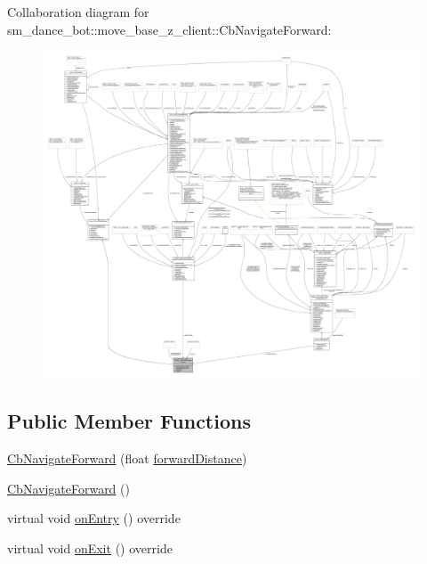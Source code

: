 Collaboration diagram for sm\+\_\+dance\+\_\+bot\+:\+:move\+\_\+base\+\_\+z\+\_\+client\+:\+:Cb\+Navigate\+Forward\+:
\nopagebreak
\begin{figure}[H]
\begin{center}
\leavevmode
\includegraphics[width=350pt]{classsm__dance__bot_1_1move__base__z__client_1_1CbNavigateForward__coll__graph}
\end{center}
\end{figure}
\subsection*{Public Member Functions}
\begin{DoxyCompactItemize}
\item 
\hyperlink{classsm__dance__bot_1_1move__base__z__client_1_1CbNavigateForward_aff86d1b0e022c3da9166cfdd33d0124b}{Cb\+Navigate\+Forward} (float \hyperlink{classsm__dance__bot_1_1move__base__z__client_1_1CbNavigateForward_a2c1a04f86c3a0c40d516654fa0b4944a}{forward\+Distance})
\item 
\hyperlink{classsm__dance__bot_1_1move__base__z__client_1_1CbNavigateForward_ac62136fa0dcc06c513e7c11d4bce75a1}{Cb\+Navigate\+Forward} ()
\item 
virtual void \hyperlink{classsm__dance__bot_1_1move__base__z__client_1_1CbNavigateForward_a75bc4e52ed09f024c37818b1bb55e738}{on\+Entry} () override
\item 
virtual void \hyperlink{classsm__dance__bot_1_1move__base__z__client_1_1CbNavigateForward_a90db9adad4099a59e5ae07f95aa1c8ac}{on\+Exit} () override
\end{DoxyCompactItemize}
